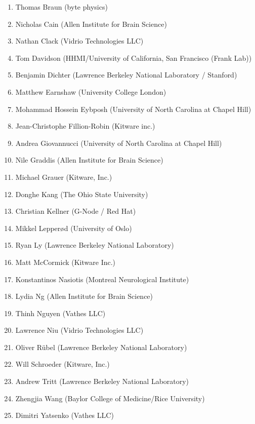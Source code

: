\documentclass{article}
\begin{document}
\begin{multicols}{2}
\begin{enumerate}[leftmargin=*]
\setlength\itemsep{0cm}
\item Thomas Braun (byte physics)
\item Nicholas Cain (Allen Institute for Brain Science)
\item Nathan Clack (Vidrio Technologies LLC)
\item Tom Davidson (HHMI/University of California, San Francisco (Frank Lab))
\item Benjamin Dichter (Lawrence Berkeley National Laboratory / Stanford)
\item Matthew Earnshaw (University College London)
\item Mohammad Hossein Eybposh (University of North Carolina at Chapel Hill)
\item Jean-Christophe Fillion-Robin (Kitware inc.)
\item Andrea Giovannucci (University of North Carolina at Chapel Hill)
\item Nile Graddis (Allen Institute for Brain Science)
\item Michael Grauer (Kitware, Inc.)
\item Donghe Kang (The Ohio State University)
\item Christian Kellner (G-Node / Red Hat)
\item Mikkel Lepperød (University of Oslo)
\item Ryan Ly (Lawrence Berkeley National Laboratory)
\item Matt McCormick (Kitware Inc.)
\item Konstantinos Nasiotis (Montreal Neurological Institute)
\item Lydia Ng (Allen Institute for Brain Science)
\item Thinh Nguyen (Vathes LLC)
\item Lawrence Niu (Vidrio Technologies LLC)
\item Oliver R\"ubel (Lawrence Berkeley National Laboratory)
\item Will Schroeder (Kitware, Inc.)
\item Andrew Tritt (Lawrence Berkeley National Laboratory)
\item Zhengjia Wang (Baylor College of Medicine/Rice University)
\item Dimitri Yatsenko (Vathes LLC)
\end{enumerate}
\end{multicols}
\clearpage
\end{document}
